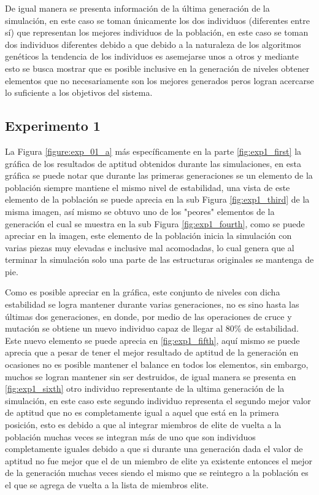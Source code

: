 De igual manera se presenta información de la última generación de la
simulación, en este caso se toman únicamente los dos individuos (diferentes
entre sí) que representan los mejores individuos de la población, en este caso
se toman dos individuos diferentes debido a que debido a la naturaleza de los
algoritmos genéticos la tendencia de los individuos es asemejarse unos a otros y
mediante esto se busca mostrar que es posible inclusive en la generación de
niveles obtener elementos que no necesariamente son los mejores generados peros
logran acercarse lo suficiente a los objetivos del sistema.

\subsection{Experimento 1}
\label{chap6:exp_1}

La Figura \ref{figure:exp_01_a} más específicamente en la parte
\ref{fig:exp1_first} la gráfica de los resultados de aptitud obtenidos durante
las simulaciones, en esta gráfica se puede notar que durante las primeras
generaciones se un elemento de la población siempre mantiene el mismo nivel de
estabilidad, una vista de este elemento de la población se puede aprecia en la
sub Figura \ref{fig:exp1_third} de la misma imagen, así mismo se obtuvo uno de
los "peores" elementos de la generación el cual se muestra en la sub Figura
\ref{fig:exp1_fourth}, como se puede apreciar en la imagen, este elemento de la
población inicia la simulación con varias piezas muy elevadas e inclusive mal
acomodadas, lo cual genera que al terminar la simulación solo una parte de las
estructuras originales se mantenga de pie.

Como es posible apreciar en la gráfica, este conjunto de niveles con dicha
estabilidad se logra mantener durante varias generaciones, no es sino hasta las
últimas dos generaciones, en donde, por medio de las operaciones de cruce y
mutación se obtiene un nuevo individuo capaz de llegar al 80\% de estabilidad.
Este nuevo elemento se puede aprecia en \ref{fig:exp1_fifth}, aquí
mismo se puede aprecia que a pesar de tener el mejor resultado de aptitud de
la generación en ocasiones no es posible mantener el balance en todos los
elementos, sin embargo, muchos se logran mantener sin ser destruidos, de igual
manera se presenta en \ref{fig:exp1_sixth} otro individuo representante de la
ultima generación de la simulación, en este caso este segundo individuo
representa el segundo mejor valor de aptitud que no es completamente igual a
aquel que está en la primera posición, esto es debido a que al integrar miembros
de elite de vuelta a la población muchas veces se integran más de uno que son
individuos completamente iguales debido a que si durante una generación dada el
valor de aptitud no fue mejor que el de un miembro de elite ya existente
entonces el mejor de la generación muchas veces siendo el mismo que se reintegro
a la población es el que se agrega de vuelta a la lista de miembros elite.

